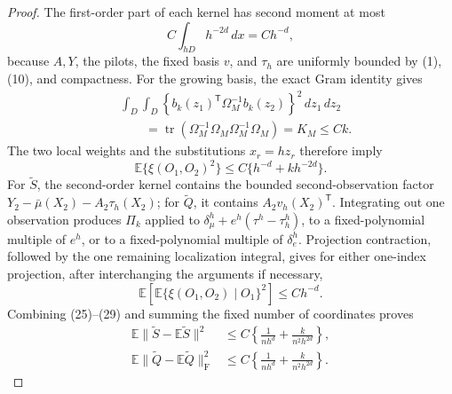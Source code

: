 \documentclass{article}
\begin{document}
\begin{proof}
The first-order part of each kernel has second moment at most
\[
 C\int_{hD}h^{-2d}\,dx=Ch^{-d},
 \tag{26}
\]
because \(A,Y\), the pilots, the fixed basis \(v\), and \(\tau_h\) are uniformly bounded by (1), (10), and compactness.  For the growing basis, the exact Gram identity gives
\[
 \begin{split}
 &\int_D\int_D
 \left\{b_k(z_1)^{\mathsf T}\Omega_M^{-1}b_k(z_2)\right\}^2\,dz_1\,dz_2\\
 &\qquad=\operatorname{tr}\left(
 \Omega_M^{-1}\Omega_M\Omega_M^{-1}\Omega_M\right)
 =K_M\leq Ck.
 \end{split}
 \tag{27}
\]
The two local weights and the substitutions \(x_r=hz_r\) therefore imply
\[
 \mathbb E\{\xi(O_1,O_2)^2\}\leq C\{h^{-d}+kh^{-2d}\}.
 \tag{28}
\]
For \(\widetilde S\), the second-order kernel contains the bounded second-observation factor \(Y_2-\bar\mu(X_2)-A_2\tau_h(X_2)\); for \(\widetilde Q\), it contains \(A_2v_h(X_2)^{\mathsf T}\).  Integrating out one observation produces \(\Pi_k\) applied to \(\delta_\mu^h+e^h(\tau^h-\tau_h^h)\), to a fixed-polynomial multiple of \(e^h\), or to a fixed-polynomial multiple of \(\delta_e^h\).  Projection contraction, followed by the one remaining localization integral, gives for either one-index projection, after interchanging the arguments if necessary,
\[
 \mathbb E\left[\mathbb E\{\xi(O_1,O_2)\mid O_1\}^2\right]\leq Ch^{-d}.
 \tag{29}
\]
Combining (25)--(29) and summing the fixed number of coordinates proves
\[
 \begin{split}
 \mathbb E\|\widetilde S-\mathbb E\widetilde S\|^2
 &\leq C\left\{\frac1{nh^d}+\frac{k}{n^2h^{2d}}\right\},\\
 \mathbb E\|\widetilde Q-\mathbb E\widetilde Q\|_{\mathrm F}^2
 &\leq C\left\{\frac1{nh^d}+\frac{k}{n^2h^{2d}}\right\}.
 \end{split}
 \tag{30}
\]


\end{proof}
\end{document}
